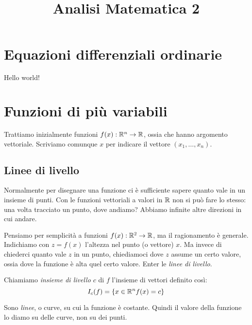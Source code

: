 



\title{Analisi Matematica 2}

\maketitle

\tableofcontents

\chapter{Equazioni differenziali ordinarie}

Hello world!

\chapter{Funzioni di pi\`u variabili}

Trattiamo inizialmente funzioni $f(x) : \mathbb{R}^n \to \mathbb{R}$, ossia che hanno
argomento vettoriale. Scriviamo comunque $x$ per indicare il vettore $(x_1, \ldots, x_n)$.

\section{Linee di livello}

Normalmente per disegnare una funzione ci \`e sufficiente sapere quanto vale in
un insieme di punti. Con le funzioni vettoriali a valori in $\mathbb{R}$ non 
si pu\`o fare lo stesso: una volta tracciato un punto, dove andiamo? Abbiamo 
infinite altre direzioni in cui andare.

Pensiamo per semplicit\`a a funzioni $f(x) : \mathbb{R}^2 \to \mathbb{R}$, ma il 
ragionamento \`e generale. Indichiamo con $z = f(x)$  l'altezza nel punto 
(o vettore) $x$. Ma invece di chiederci quanto vale $z$ in un punto, chiediamoci 
dove $z$ assume un certo valore, ossia dove la funzione \`e alta quel certo valore.
Enter le \emph{linee di livello}.

\begin{defn}
        Chiamiamo \emph{insieme di livello $c$} di $f$ l'insieme di vettori definito
        cos\`i:
        \[
                I_{c}(f) = \{ x \in \mathbb{R}^n f(x) = c \}
        \]
\end{defn}

Sono \emph{linee}, o curve, su cui la funzione \`e costante. Quindi il valore della funzione 
lo diamo su delle curve, non su dei punti.

